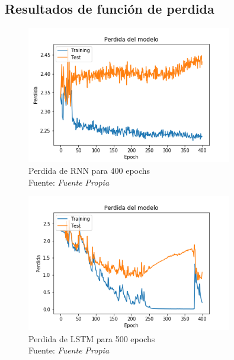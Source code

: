 \subsection{Resultados de función de perdida}

\begin{figure}[H]
	\centering
	\includegraphics[width=0.8\textwidth]{Figures/rnn_cost_400_13mfcc}
	\caption{Perdida de RNN para 400 epochs\\ Fuente: {\textit{Fuente Propia}}}
	\label{RNNSIMPLEcost}
\end{figure} 


\begin{figure}[H]
	\centering
	\includegraphics[width=0.8\textwidth]{Figures/lstm_400_cost_13mfcc}
	\caption{Perdida de LSTM para 500 epochs\\ Fuente: {\textit{Fuente Propia}}}
	\label{LSTMsimplecost}
\end{figure} 

